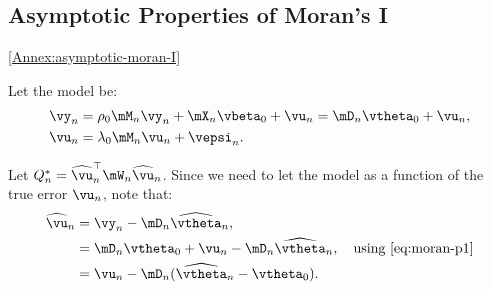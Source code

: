 \documentclass[english,12pt]{book}\usepackage[]{graphicx}\usepackage[]{xcolor}
\begin{document}
\begin{subappendices}

\section{Asymptotic Properties of Moran's I}\ref{Annex:asymptotic-moran-I}


Let the model be:
\begin{equation}\label{eq:moran-p1}
\begin{aligned}
  \vy_n &= \rho_0\mM_n\vy_n + \mX_n\vbeta_0 + \vu_n  =  \mD_n\vtheta_0 + \vu_n, \\
  \vu_n &= \lambda_0\mM_n\vu_n + \vepsi_n.
\end{aligned}
\end{equation}

Let $Q_n^* = \widehat{\vu}_n^\top\mW_n\widehat{\vu}_n$. Since we need to let the model as a function of the true error $\vu_n$, note that:
\begin{equation}\label{eq:moran-p2}
\begin{aligned}
\widehat{\vu}_n & = \vy_n - \mD_n\widehat{\vtheta}_n, \\
& = \mD_n\vtheta_0 + \vu_n -\mD_n\widehat{\vtheta}_n,\quad\mbox{using \eqref{eq:moran-p1}} \\
&= \vu_n - \mD_n(\widehat{\vtheta}_n - \vtheta_0).
\end{aligned}
\end{equation}


\end{subappendices}
\end{document}
